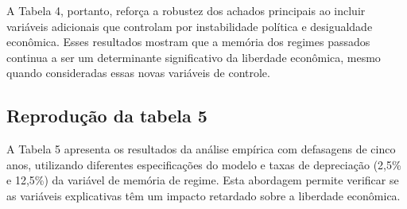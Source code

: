 	A Tabela 4, portanto, reforça a robustez dos achados principais ao incluir variáveis adicionais que controlam por instabilidade política e desigualdade econômica. Esses resultados mostram que a memória dos regimes passados continua a ser um determinante significativo da liberdade econômica, mesmo quando consideradas essas novas variáveis de controle.

	\begin{table}
		\caption{Tabela 4 do Artigo Original - Controles adicionais.}
		\label{tab:tabela4}
		\scriptsize
		\end{table}


		\subsection{Reprodução da tabela 5}

		A Tabela 5 apresenta os resultados da análise empírica com defasagens de cinco anos, utilizando diferentes especificações do modelo e taxas de depreciação (2,5\% e 12,5\%) da variável de memória de regime. Esta abordagem permite verificar se as variáveis explicativas têm um impacto retardado sobre a liberdade econômica.

